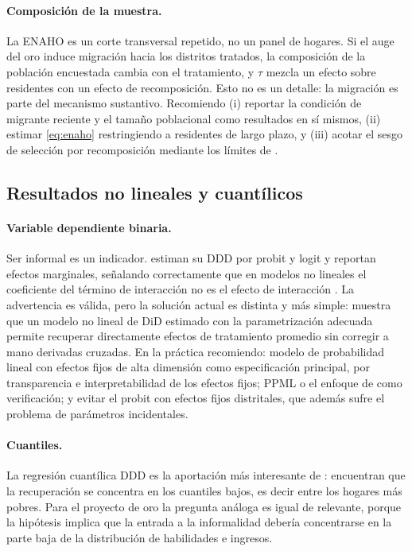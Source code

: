\documentclass[11pt,a4paper]{article}
\begin{document}
\paragraph{Composición de la muestra.} La ENAHO es un corte transversal repetido, no un panel de hogares. Si el auge del oro induce migración hacia los distritos tratados, la composición de la población encuestada cambia con el tratamiento, y $\tau$ mezcla un efecto sobre residentes con un efecto de recomposición. Esto no es un detalle: la migración es parte del mecanismo sustantivo. Recomiendo (i) reportar la condición de migrante reciente y el tamaño poblacional como resultados en sí mismos, (ii) estimar \eqref{eq:enaho} restringiendo a residentes de largo plazo, y (iii) acotar el sesgo de selección por recomposición mediante los límites de \citet{lee2009}.

\subsection{Resultados no lineales y cuantílicos}

\paragraph{Variable dependiente binaria.} Ser informal es un indicador. \citet{pecastaing2020} estiman su DDD por probit y logit y reportan efectos marginales, señalando correctamente que en modelos no lineales el coeficiente del término de interacción no es el efecto de interacción \citep{ai2003,karaca2012}. La advertencia es válida, pero la solución actual es distinta y más simple: \citet{wooldridge2023} muestra que un modelo no lineal de DiD estimado con la parametrización adecuada permite recuperar directamente efectos de tratamiento promedio sin corregir a mano derivadas cruzadas. En la práctica recomiendo: modelo de probabilidad lineal con efectos fijos de alta dimensión como especificación principal, por transparencia e interpretabilidad de los efectos fijos; PPML o el enfoque de \citet{wooldridge2023} como verificación; y evitar el probit con efectos fijos distritales, que además sufre el problema de parámetros incidentales.

\paragraph{Cuantiles.} La regresión cuantílica DDD es la aportación más interesante de \citet{pecastaing2020}: encuentran que la recuperación se concentra en los cuantiles bajos, es decir entre los hogares más pobres. Para el proyecto de oro la pregunta análoga es igual de relevante, porque la hipótesis implica que la entrada a la informalidad debería concentrarse en la parte baja de la distribución de habilidades e ingresos.
\end{document}
